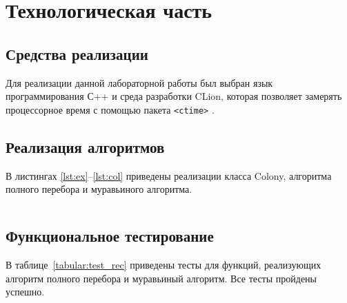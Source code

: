 \chapter{Технологическая часть}

\section{Средства реализации}

Для реализации данной лабораторной работы был выбран язык программирования С++ \cite{c} и среда разработки CLion, которая позволяет замерять процессорное время с помощью пакета \texttt{<ctime>} \cite{ctime}.

\section{Реализация алгоритмов}

В листингах \ref{lst:ex}--\ref{lst:col} приведены реализации класса Colony, алгоритма полного перебора и муравьиного алгоритма.

\begin{lstlisting}[label=lst:ex,caption=Алгоритм a]
\end{lstlisting}

\clearpage

\section{Функциональное тестирование}
В таблице~\ref{tabular:test_rec} приведены тесты для функций, реализующих алгоритм полного перебора и муравьиный алгоритм.
Все тесты пройдены успешно.
